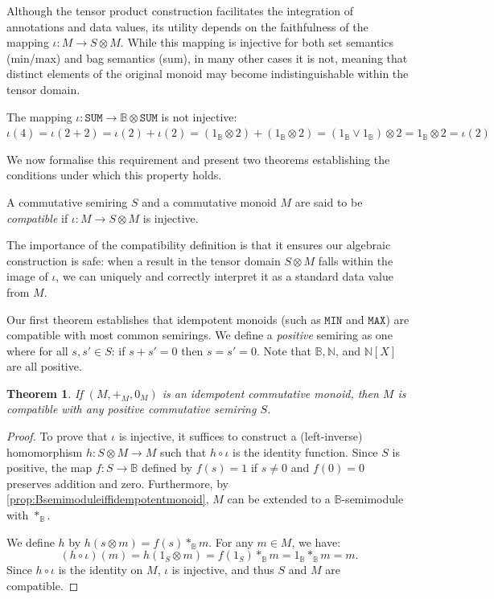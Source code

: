 \documentclass[oneside, 11pt]{amsbook}
\theoremstyle{plain}
\newtheorem{thm}{Theorem}[section]
\theoremstyle{definition}
\theoremstyle{remark}
\begin{document}
Although the tensor product construction facilitates the integration of annotations and data values, its utility depends on the faithfulness of the mapping $\iota : M \to S \otimes M$. While this mapping is injective for both set semantics (min/max) and bag semantics (sum), in many other cases it is not, meaning that distinct elements of the original monoid may become indistinguishable within the tensor domain.

\begin{exmpl}
    The mapping $\iota : \texttt{SUM} \to \mathbb{B} \otimes \texttt{SUM}$ is not injective: $\iota(4) = \iota(2+2) = \iota(2) + \iota(2) = (1_{\mathbb{B}} \otimes 2) + (1_{\mathbb{B}} \otimes 2) = (1_{\mathbb{B}} \lor 1_{\mathbb{B}}) \otimes 2 = 1_{\mathbb{B}} \otimes 2 = \iota(2)$
\end{exmpl}

We now formalise this requirement and present two theorems establishing the conditions under which this property holds.

\begin{defn}[Compatible]
    A commutative semiring $S$ and a commutative monoid $M$ are said to be \emph{compatible} if $\iota : M \to S \otimes M$ is injective.
\end{defn}

The importance of the compatibility definition is that it ensures our algebraic construction is safe: when a result in the tensor domain $S \otimes M$ falls within the image of $\iota$, we can uniquely and correctly interpret it as a standard data value from $M$.

Our first theorem establishes that idempotent monoids (such as $\texttt{MIN}$ and $\texttt{MAX}$) are compatible with most common semirings. We define a \emph{positive} semiring as one where for all $s, s' \in S$: if $s + s' = 0 $ then $s = s' = 0$. Note that $\mathbb{B}, \mathbb{N}$, and $\mathbb{N}[X]$ are all positive.

\begin{thm}
    \label{thm:ifidempotentthencompatible}
    If $(M, +_M, 0_M)$ is an idempotent commutative monoid, then $M$ is compatible with any positive commutative semiring $S$.
\end{thm}
\begin{proof}
    To prove that $\iota$ is injective, it suffices to construct a (left-inverse) homomorphism $h : S \otimes M \to M$ such that $h \circ \iota$ is the identity function. Since $S$ is positive, the map $f: S \to \mathbb{B}$ defined by $f(s) = 1$ if $s \neq 0$ and $f(0) = 0$ preserves addition and zero. Furthermore, by \autoref{prop:Bsemimoduleiffidempotentmonoid}, $M$ can be extended to a $\mathbb{B}$-semimodule with $\ast_{\mathbb{B}}$.

    We define $h$ by $h(s \otimes m) = f(s) \ast_{\mathbb{B}} m$. For any $m \in M$, we have:
    \[
        (h \circ \iota)(m) = h(1_S \otimes m) = f(1_S) \ast_{\mathbb{B}} m = 1_{\mathbb{B}} \ast_{\mathbb{B}} m = m.
    \]
    Since $h \circ \iota$ is the identity on $M$, $\iota$ is injective, and thus $S$ and $M$ are compatible.
\end{proof}
\end{document}
